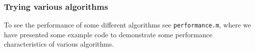 \subsubsection{Trying various algorithms}
\label{subsubsec:trying_various_algorithms}

To see the performance of some different algorithms see \verb|performance.m|, where we have presented some example code to demonstrate some performance characteristics of various algorithms.

\clearpage